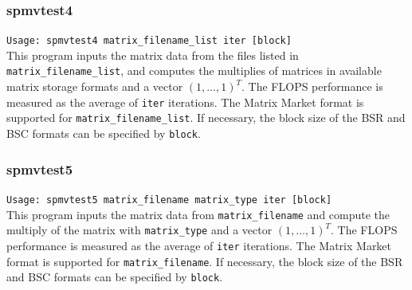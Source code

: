 \documentclass[a4paper]{article}
\begin{document}
\subsubsection{spmvtest4}

\verb+Usage: spmvtest4 matrix_filename_list iter [block]+\\

This program inputs the matrix data from the files listed in {\tt matrix\_filename\_list}, 
and computes the multiplies of matrices in available matrix 
storage formats and a vector $(1,\dots,1)^T$. 
The FLOPS performance is measured as the average of {\tt iter}
iterations. 
The Matrix Market format is supported for {\tt matrix\_filename\_list}. 
If necessary, the block size of the BSR and BSC formats can be specified
by {\tt block}.

\subsubsection{spmvtest5}

\verb+Usage: spmvtest5 matrix_filename matrix_type iter [block]+\\

This program inputs the matrix data from {\tt matrix\_filename} 
and compute the multiply of the matrix 
with \verb|matrix_type| and a vector $(1,\dots,1)^T$. 
The FLOPS performance is measured as the average of {\tt iter} iterations. 
The Matrix Market format is supported for {\tt matrix\_filename}. 
If necessary, the block size of the BSR and BSC formats can be specified by {\tt block}.
\end{document}
